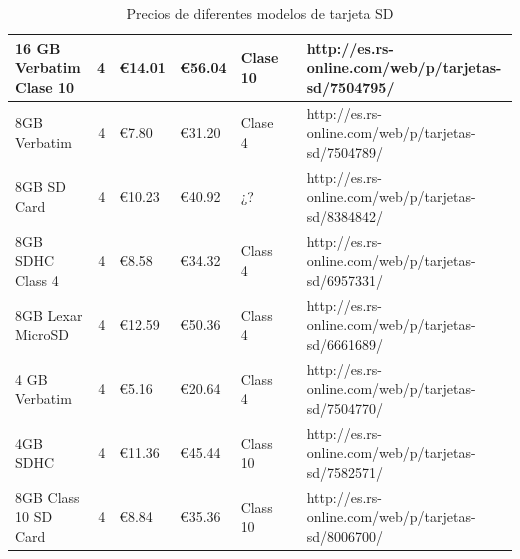 \begin{landscape}
\begin{table}
\begin{tabular}{|l|r|l|l|l|p{3.5cm}|p{4.5cm}|}
\rowcolor{LightCyan}
16 GB Verbatim Clase 10&4&€14.01&€56.04&Clase 10&&http://es.rs-online.com/web/p/tarjetas-sd/7504795/\\
\hline
8GB Verbatim&4&€7.80&€31.20&Clase 4&&http://es.rs-online.com/web/p/tarjetas-sd/7504789/\\
\hline
8GB SD Card&4&€10.23&€40.92&¿?&&http://es.rs-online.com/web/p/tarjetas-sd/8384842/\\
\hline
8GB SDHC Class 4&4&€8.58&€34.32&Class 4&&http://es.rs-online.com/web/p/tarjetas-sd/6957331/\\
\hline
8GB Lexar MicroSD&4&€12.59&€50.36&Class 4&&http://es.rs-online.com/web/p/tarjetas-sd/6661689/\\
\hline
4 GB Verbatim&4&€5.16&€20.64&Class 4&&http://es.rs-online.com/web/p/tarjetas-sd/7504770/\\
\hline
4GB SDHC&4&€11.36&€45.44&Class 10&&http://es.rs-online.com/web/p/tarjetas-sd/7582571/\\
\hline
\rowcolor{LightCyan}
8GB Class 10 SD Card&4&€8.84&€35.36&Class 10&&http://es.rs-online.com/web/p/tarjetas-sd/8006700/\\
\hline
\end{tabular}
\caption{Precios de diferentes modelos de tarjeta SD}
\end{table}
\end{landscape}

